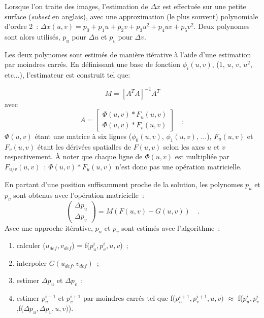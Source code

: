 \documentclass[
	a4paper, %
	10pt, %
	twoside, %
	french
]{LTJournalArticle}
\begin{document}
Lorsque l'on traite des images, l'estimation de $\Delta x$ est effectuée sur une petite surface (\textit{subset} en anglais), avec une approximation (le plus souvent) polynomiale d'ordre 2~: $\Delta x(u, v) = p_0 + p_1u + p_2v + p_3u^2 + p_4 uv + p_5 v^2$.
Deux polynomes sont alors utilisés, $p_u$ pour $\Delta u$ et $p_v$ pour $\Delta v$.

Les deux polynomes sont estimés de manière itérative à l'aide d'une estimation par moindres carrés.
En définissant une base de fonction $\phi_i(u, v)$, ($1$, $u$, $v$, $u^2$, etc...), l'estimateur est construit tel que:

\begin{equation}
	M = [A^T A]^{-1} A^T
\end{equation}
avec
\begin{equation}
	A = \left[
		\begin{array}{c}
			\Phi(u, v) * F_u(u, v)
			\\ \hline
			\Phi(u, v) * F_v(u, v)
		\end{array}
	\right] \quad ,
\end{equation}
$\Phi(u, v)$ étant une matrice à six lignes ($\phi_0(u, v)$, $\phi_1(u, v)$, ...), $F_u(u, v)$ et $F_v(u, v)$ étant les dérivées spatialles de $F(u, v)$ selon les axes $u$ et $v$ respectivement.
À noter que chaque ligne de $\Phi(u, v)$ est multipliée par $F_{u/v}(u,v)$~: $\Phi(u, v) * F_u(u,v)$ n'est donc pas une opération matricielle.

En partant d'une position suffisamment proche de la solution, les polynomes $p_u$ et $p_v$ sont obtenus avec l'opération matricielle~:
\begin{equation}
	\left(
	\begin{array}{c}
		\Delta p_u\\
		\Delta p_v
	\end{array}
	\right)
	=
	M (F(u,v) - G(u,v)) \quad .
\end{equation} 
Avec une approche itérative, $p_u$ et $p_v$ sont estimés avec l'algorithme~:
\begin{enumerate}
	\item calculer ($u_{def}, v_{def}$) = f($p_u^i, p_v^i, u, v$)~;
	\item interpoler $G(u_{def}, v_{def})$~;
	\item estimer $\Delta p_u$ et $\Delta p_v$~;
	\item estimer $p_u^{i+1}$ et $p_v^{i+1}$ par moindres carrés tel que f($p_u^{i+1}, p_v^{i+1}, u, v)$ $\approx$ f($p_u^{i}, p_v^{i}$,f($\Delta p_u, \Delta p_v, u, v)$).
\end{enumerate}
\end{document}
